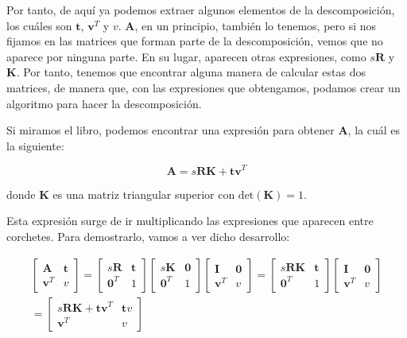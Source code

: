 \documentclass[11pt,a4paper]{article}
\begin{document}
Por tanto, de aquí ya podemos extraer algunos elementos de la descomposición,
los cuáles son $\mathbf{t}$, $\mathbf{v}^T$ y $v$. $\mathbf{A}$, en un principio, también
lo tenemos, pero si nos fijamos en las matrices que forman parte de la descomposición,
vemos que no aparece por ninguna parte. En su lugar, aparecen otras expresiones, como
$s\mathbf{R}$ y $\mathbf{K}$. Por tanto, tenemos que encontrar alguna manera
de calcular estas dos matrices, de manera que, con las expresiones que obtengamos,
podamos crear un algoritmo para hacer la descomposición.

Si miramos el libro, podemos encontrar
una expresión para obtener $\mathbf{A}$, la cuál es la siguiente:

\begin{equation}
\label{dec}
	\mathbf{A} = s\mathbf{RK} + \mathbf{tv}^T
\end{equation}

\noindent donde $\mathbf{K}$ es una matriz triangular superior con $\text{det}(\mathbf{K})=1$.

Esta expresión surge de ir multiplicando las expresiones que aparecen
entre corchetes. Para demostrarlo, vamos a ver dicho desarrollo:

\begin{gather*}
\begin{bmatrix} \mathbf{A} & \mathbf{t} \\ \mathbf{v}^T & v
\end{bmatrix} =
\begin{bmatrix} s\mathbf{R} & \mathbf{t} \\ \mathbf{0}^T & 1 \end{bmatrix}
\begin{bmatrix} s\mathbf{K} & \mathbf{0} \\ \mathbf{0}^T & 1 \end{bmatrix}
\begin{bmatrix} \mathbf{I} & \mathbf{0} \\ \mathbf{v}^T & v \end{bmatrix}
=
\begin{bmatrix} s\mathbf{RK} & \mathbf{t} \\ \mathbf{0}^T & 1 \end{bmatrix}
\begin{bmatrix} \mathbf{I} & \mathbf{0} \\ \mathbf{v}^T & v \end{bmatrix}
\\ =
\begin{bmatrix} s\mathbf{RK} + \mathbf{tv}^T & \mathbf{t}v \\ \mathbf{v}^T & v \end{bmatrix}
\end{gather*}
\end{document}
